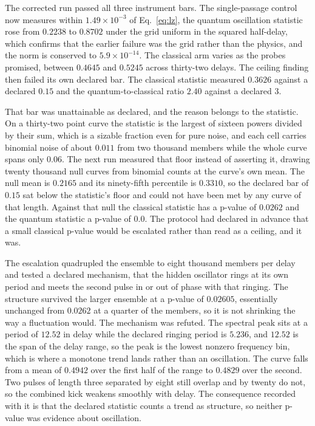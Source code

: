 \documentclass[aps,pre,reprint,nofootinbib,floatfix]{revtex4-2}
\begin{document}
The corrected run passed all three instrument bars.  The single-passage
control now measures within $1.49 \times 10^{-3}$ of Eq.~\eqref{eq:lz},
the quantum oscillation statistic rose from $0.2238$ to $0.8702$ under
the grid uniform in the squared half-delay, which confirms that the
earlier failure was the grid rather than the physics, and the norm is
conserved to $5.9 \times 10^{-14}$.  The classical arm varies as the
probes promised, between $0.4645$ and $0.5245$ across thirty-two
delays.  The ceiling finding then failed its own declared bar.  The
classical statistic measured $0.3626$ against a declared $0.15$ and the
quantum-to-classical ratio $2.40$ against a declared 3.

That bar was unattainable as declared, and the reason belongs to the
statistic.  On a thirty-two point curve the statistic is the largest of
sixteen powers divided by their sum, which is a sizable fraction even
for pure noise, and each cell carries binomial noise of about $0.011$
from two thousand members while the whole curve spans only $0.06$.  The
next run measured that floor instead of asserting it, drawing twenty
thousand null curves from binomial counts at the curve's own mean.  The
null mean is $0.2165$ and its ninety-fifth percentile is $0.3310$, so
the declared bar of $0.15$ sat below the statistic's floor and could
not have been met by any curve of that length.  Against that null the
classical statistic has a p-value of $0.0262$ and the quantum statistic
a p-value of $0.0$.  The protocol had declared in advance that a small
classical p-value would be escalated rather than read as a ceiling, and
it was.

The escalation quadrupled the ensemble to eight thousand members per
delay and tested a declared mechanism, that the hidden oscillator rings
at its own period and meets the second pulse in or out of phase with
that ringing.  The structure survived the larger ensemble at a p-value
of $0.02605$, essentially unchanged from $0.0262$ at a quarter of the
members, so it is not shrinking the way a fluctuation would.  The
mechanism was refuted.  The spectral peak sits at a period of $12.52$
in delay while the declared ringing period is $5.236$, and $12.52$ is
the span of the delay range, so the peak is the lowest nonzero
frequency bin, which is where a monotone trend lands rather than an
oscillation.  The curve falls from a mean of $0.4942$ over the first
half of the range to $0.4829$ over the second.  Two pulses of length
three separated by eight still overlap and by twenty do not, so the
combined kick weakens smoothly with delay.  The consequence recorded
with it is that the declared statistic counts a trend as structure, so
neither p-value was evidence about oscillation.
\end{document}
